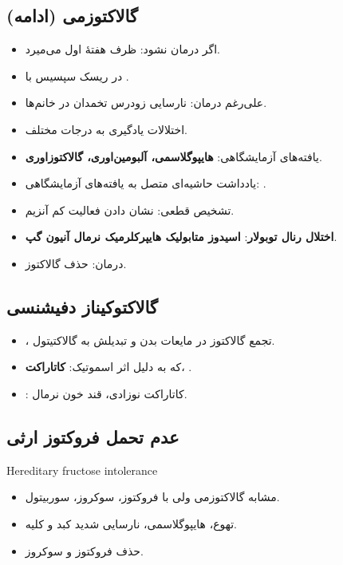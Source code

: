 \documentclass[12pt,a4paper]{article}
\begin{document}
\clearpage
{}
\subsection*{گالاکتوزمی (ادامه)}
\begin{itemize}
\item اگر درمان نشود: ظرف هفتهٔ اول می‌میرد.
\item در ریسک سپسیس با \textbf{}.
\item علی‌رغم درمان: نارسایی زودرس تخمدان در خانم‌ها.
\item اختلالات یادگیری به درجات مختلف.
\item یافته‌های آزمایشگاهی: \textbf{هایپوگلاسمی، آلبومین‌اوری، گالاکتوزاوری}.
\item یادداشت حاشیه‌ای متصل به یافته‌های آزمایشگاهی: .
\item تشخیص قطعی: نشان دادن فعالیت کم آنزیم.
\item \textbf{اختلال رنال توبولار}: \textbf{اسیدوز متابولیک هایپرکلرمیک نرمال آنیون گپ}.
\item درمان: حذف گالاکتوز.
\end{itemize}

\subsection*{گالاکتوکیناز دفیشنسی}
\begin{itemize}
\item {}، تجمع گالاکتوز در مایعات بدن و تبدیلش به گالاکتیتول.
\item که به دلیل اثر اسموتیک: \textbf{کاتاراکت}، .
\item {}: کاتاراکت نوزادی، قند خون نرمال.
\end{itemize}

\subsection*{عدم تحمل فروکتوز ارثی}
\begin{latin}
Hereditary fructose intolerance
\end{latin}
\begin{itemize}
\item مشابه گالاکتوزمی ولی با فروکتوز، سوکروز، سوربیتول.
\item تهوع، هایپوگلاسمی، نارسایی شدید کبد و کلیه.
\item حذف فروکتوز و سوکروز.
\end{itemize}
\end{document}
